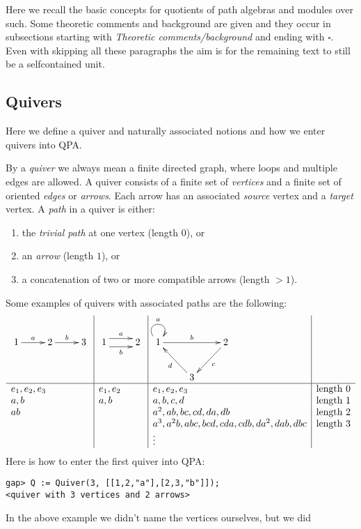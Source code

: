 \documentclass{amsart}
\theoremstyle{definition}
\theoremstyle{theoretic}
\begin{document}
Here we recall the basic concepts for quotients of path algebras and
modules over such.  Some theoretic comments and background are given
and they occur in subsections starting with \emph{Theoretic
  comments/background} and ending with $\square$.  Even with skipping
all these paragraphs the aim is for the remaining text to still be a
selfcontained unit.

\subsection{Quivers}
Here we define a quiver and naturally associated notions and how we
enter quivers into QPA.

By a \emph{quiver} we always mean a finite directed graph, where loops
and multiple edges are allowed.  A quiver consists of a finite set of
\emph{vertices} and a finite set of oriented \emph{edges} or
\emph{arrows}.  Each arrow has an associated \emph{source} vertex and
a \emph{target} vertex.  A \emph{path} in a quiver is either:
\begin{enumerate}[\rm(i)]
\item the \emph{trivial path} at one vertex (length $0$), or
\item an \emph{arrow} (length $1$), or 
\item a concatenation of two or more compatible arrows (length $> 1$).
\end{enumerate}  
Some examples of quivers with associated paths are the following:
\[\begin{array}{l|l|l|l}
\xymatrix{1\ar[r]^a & 2\ar[r]^b & 3}  &
\xymatrix{1\ar@<1ex>[r]^a\ar@<-1ex>[r]_b & 2} & 
\xymatrix{1\ar@(ul,ur)^a\ar[rr]^b & & 2\ar[dl]^c \\ & 3\ar[ul]^d & } &
\\ \hline
e_1, e_2, e_3 & e_1, e_2 & e_1, e_2, e_3 & \textrm{length 0}\\
a, b & a, b & a, b, c, d & \textrm{length 1}\\
ab & & a^2, ab, bc, cd, da, db & \textrm{length 2}\\
& & a^3, a^2b, abc, bcd, cda, cdb, da^2, dab, dbc & \textrm{length 3}\\
& & \vdots & 
\end{array}\]
Here is how to enter the first quiver into QPA:
\begin{verbatim}
gap> Q := Quiver(3, [[1,2,"a"],[2,3,"b"]]); 
<quiver with 3 vertices and 2 arrows>
\end{verbatim} 
In the above example we didn't name the vertices ourselves, but we did
\end{document}
